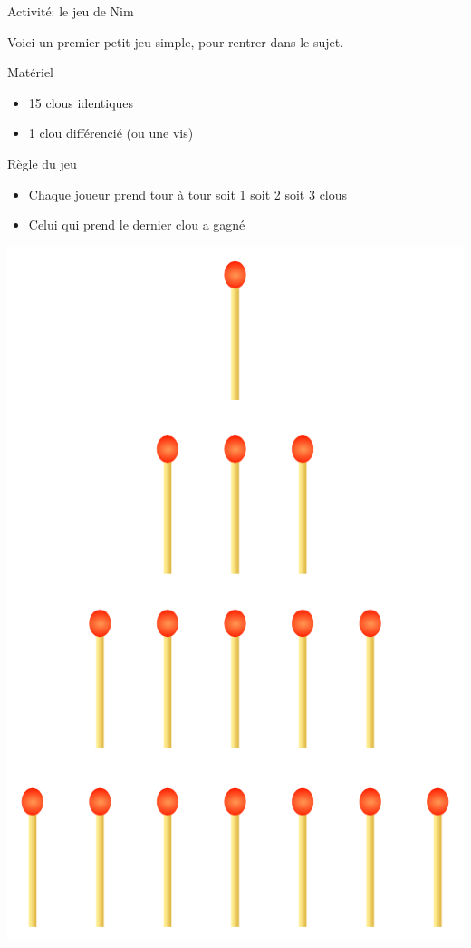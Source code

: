 \documentclass[final,hyperref={pdfpagelabels=false}]{beamer}
\begin{document}
\begin{frame}{Activité: le jeu de Nim}

  Voici un premier petit jeu simple, pour rentrer dans le sujet.

  \begin{block}{Matériel}
    \begin{itemize}
    \item 15 clous identiques
    \item 1 clou différencié (ou une vis)
    \end{itemize}
  \end{block}
  
  \begin{block}{Règle du jeu}
    \begin{itemize}
    \item Chaque joueur prend tour à tour soit 1 soit 2 soit 3 clous
    \item Celui qui prend le dernier clou a gagné
    \end{itemize}
  \end{block}

  \bigskip\bigskip
  \centerline{\includegraphics[height=20\baselineskip]{img/Pyramidal_matches.pdf}}\label{img:matches}


\end{frame}
\end{document}
